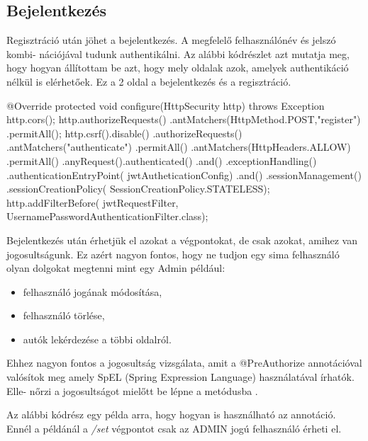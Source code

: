 \subsection{Bejelentkezés}

Regisztráció után jöhet a bejelentkezés. A megfelelő felhasználónév és jelszó kombi-
nációjával tudunk authentikálni. Az alábbi kódrészlet azt mutatja meg, hogy hogyan állítottam be azt, hogy mely oldalak azok, amelyek authentikáció nélkül is elérhetőek. Ez a 2 oldal a bejelentkezés és a regisztráció.

\begin{java}
    @Override
    protected void configure(HttpSecurity http)
     throws Exception {
        http.cors();
        http.authorizeRequests()
        .antMatchers(HttpMethod.POST,"register")
        .permitAll();
        http.csrf().disable()
          .authorizeRequests()
          .antMatchers("authenticate")
          .permitAll()
          .antMatchers(HttpHeaders.ALLOW)
          .permitAll()
          .anyRequest().authenticated()
          .and()
          .exceptionHandling()
          .authenticationEntryPoint(
           jwtAutheticationConfig)
          .and()
          .sessionManagement()
          .sessionCreationPolicy(
          SessionCreationPolicy.STATELESS);
          http.addFilterBefore(
          jwtRequestFilter,
          UsernamePasswordAuthenticationFilter.class);
}
\end{java}

Bejelentkezés után érhetjük el azokat a végpontokat, de csak azokat, amihez van jogosultságunk. Ez azért nagyon fontos, hogy ne tudjon egy sima felhasználó olyan dolgokat megtenni mint egy Admin például:

\begin{itemize}
\item felhasználó jogának módosítása,
\item felhasználó törlése,
\item autók lekérdezése a többi oldalról.
\end{itemize}

Ehhez nagyon fontos a jogosultság vizsgálata, amit a @PreAuthorize annotációval valósítok meg amely SpEL (Spring Expression Language) használatával írhatók. Elle-
nőrzi a jogosultságot mielőtt be lépne a metódusba \cite{SpringSecurity}.

Az alábbi kódrész egy példa arra, hogy hogyan is használható az annotáció. Ennél a példánál a \textit{/set} végpontot csak az ADMIN jogú felhasználó érheti el.

